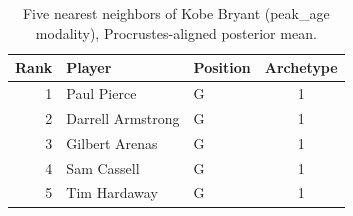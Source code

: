 \begin{table}[htbp]
  \centering\small
  \begin{tabular}{rllc}
    \toprule
    Rank & Player & Position & Archetype \\
    \midrule
    1 & Paul Pierce & G & 1 \\
    2 & Darrell Armstrong & G & 1 \\
    3 & Gilbert Arenas & G & 1 \\
    4 & Sam Cassell & G & 1 \\
    5 & Tim Hardaway & G & 1 \\
    \bottomrule
  \end{tabular}
  \caption{Five nearest neighbors of Kobe Bryant (peak_age modality), Procrustes-aligned posterior mean.}
  \label{tab:Kobe_Bryant_neighbors_peak_age}
\end{table}

